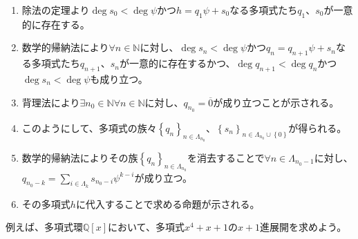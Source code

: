 \documentclass[dvipdfmx]{jsarticle}
\begin{document}
\begin{enumerate}
\item
  除法の定理より$\deg s_{0} < \deg\psi$かつ$h = q_{1}\psi + s_{0}$なる多項式たち$q_{1}$、$s_{0}$が一意的に存在する。
\item
  数学的帰納法により$\forall n \in \mathbb{N}$に対し、$\deg s_{n} < \deg\psi$かつ$q_{n} = q_{n + 1}\psi + s_{n}$なる多項式たち$q_{n + 1}$、$s_{n}$が一意的に存在するかつ、$\deg q_{n + 1} < \deg q_{n}$かつ$\deg s_{n} < \deg\psi$も成り立つ。
\item
  背理法により$\exists n_{0} \in \mathbb{N}\forall n \in \mathbb{N}$に対し、$q_{n_{0}} = \overline{0}$が成り立つことが示される。
\item
  このようにして、多項式の族々$\left\{ q_{n} \right\}_{n \in \varLambda_{n_{0}}}$、$\left\{ s_{n} \right\}_{n \in \varLambda_{n_{0}} \cup \left\{ 0 \right\}}$が得られる。
\item
  数学的帰納法によりその族$\left\{ q_{n} \right\}_{n \in \varLambda_{n_{0}}}$を消去することで$\forall n \in \varLambda_{n_{0} - 1}$に対し、$q_{n_{0} - k} = \sum_{i \in \varLambda_{k}} {s_{n_{0} - i}\psi^{k - i}}$が成り立つ。
\item
  その多項式$h$に代入することで求める命題が示される。
\end{enumerate}\par
例えば、多項式環$\mathbb{Q}[ x]$において、多項式$x^{4} + x + 1$の$x + 1$進展開を求めよう。
\end{document}
